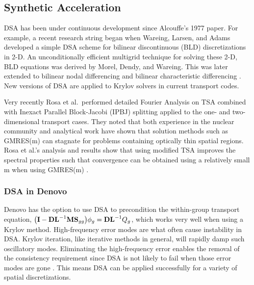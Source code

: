 \subsection{Synthetic Acceleration}
DSA has been under continuous development since Alcouffe's 1977 paper. For example, a recent research string began when Wareing, Larsen, and Adams developed a simple DSA scheme for bilinear discontinuous (BLD) discretizations in 2-D. An unconditionally efficient multigrid technique for solving these 2-D, BLD equations was derived by Morel, Dendy, and Wareing. This was later extended to bilinear nodal differencing and bilinear characteristic differencing \cite{Adams2002}. New versions of DSA are applied to Krylov solvers in current transport codes.

Very recently Rosa et al.\ performed detailed Fourier Analysis on TSA combined with Inexact Parallel Block-Jacobi (IPBJ) splitting applied to the one- and two-dimensional transport cases. They noted that both experience in the nuclear community and analytical work have shown that solution methods such as GMRES(m) can stagnate for problems containing optically thin spatial regions. Rosa et al.'s analysis and results show that using modified TSA improves the spectral properties such that convergence can be obtained using a relatively small m when using GMRES(m) \cite{Rosa2010}.

\subsubsection{DSA in Denovo}
Denovo has the option to use DSA to precondition the within-group transport equation, $\bigl(\mathbf{I} - \mathbf{DL}^{-1}\mathbf{MS}_{gg}\bigr) \phi_{g} = \mathbf{DL}^{-1}Q_{g}$, which works very well when using a Krylov method. High-frequency error modes are what often cause instability in DSA. Krylov iteration, like iterative methods in general, will rapidly damp such oscillatory modes. Eliminating the high-frequency error enables the removal of the consistency requirement since DSA is not likely to fail when those error modes are gone \cite{Evans2009d}. This means DSA can be applied successfully for a variety of spatial discretizations. 

